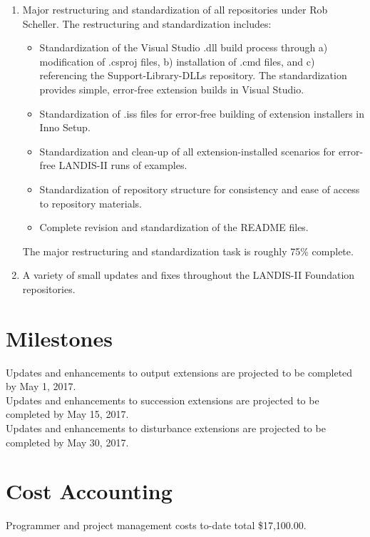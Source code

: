 \documentclass[letterpaper,11pt]{texMemo}
\begin{document}
\begin{enumerate}
  \item Major restructuring and standardization of all repositories under Rob Scheller. The restructuring and standardization includes:
\begin{itemize}
  \item Standardization of the Visual Studio .dll build process through a) modification of .csproj files, b) installation of .cmd files, and c) referencing the Support-Library-DLLs repository. The standardization provides simple, error-free extension builds in Visual Studio.
  \item Standardization of .iss files for error-free building of extension installers in Inno Setup.
  \item Standardization and clean-up of all extension-installed scenarios for error-free LANDIS-II runs of examples.
  \item Standardization of repository structure for consistency and ease of access to repository materials.
  \item Complete revision and standardization of the README files.
\end{itemize}
The major restructuring and standardization task is roughly 75\% complete.

  \item A variety of small updates and fixes throughout the LANDIS-II Foundation repositories.
\end{enumerate}

\section*{Milestones}
Updates and enhancements to output extensions are projected to be completed by May 1, 2017. \\

Updates and enhancements to succession extensions are projected to be completed by May 15, 2017.\\

Updates and enhancements to disturbance extensions are projected to be completed by May 30, 2017.


\section*{Cost Accounting}
Programmer and project management costs to-date total \$17,100.00.
\end{document}
